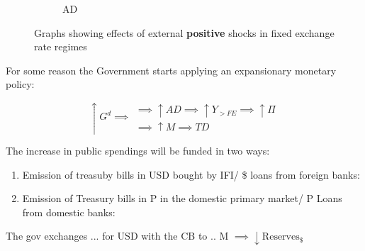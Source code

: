 \documentclass{report}
\begin{document}
\begin{figure}[H]
\begin{subfigure}{.5\textwidth}
  \caption{AD}
  \label{fig:sub2}
\end{subfigure}
\caption{Graphs showing effects of external \textbf{positive} shocks in fixed exchange rate regimes}
\label{fig:test}
\end{figure}

For some reason the Government starts applying an expansionary monetary policy:

\begin{equation*} \uparrow G^d \implies
    \begin{array}{|l}
     \implies \uparrow AD \implies \uparrow Y_{> FE} \implies \uparrow \Pi \\
     \implies  \uparrow M \implies TD
    \end{array}
\end{equation*}

The increase in public spendings will be funded in two ways:

\begin{enumerate}
    \item Emission of treasuby bills in USD bought by IFI/ \$ loans from foreign banks:
 \item Emission of Treasury bills in P in the domestic primary market/ P Loans from domestic banks:
\end{enumerate}

The gov exchanges ... for USD with the CB to .. M $\implies \downarrow \text{Reserves}_{\$} $
\end{document}

